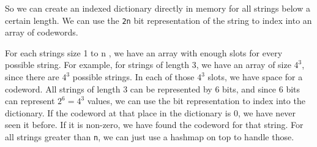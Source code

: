 \documentclass[12pt,twoside]{reedthesis}
\begin{document}
So we can create an indexed dictionary directly in memory for all strings below a certain length. We can use the \texttt{2n} bit representation of the string
to index into an array of codewords.

For each strings size 1 to n , we have an array with enough slots for every possible string. For example, for strings of length 3, we have an array of size \(4^3\), since there are \(4^3\) possible strings. In each of those \(4^3\) slots, we have space for a codeword. All strings of length 3 can be represented by 6 bits, and since 6 bits can represent \(2^6=4^3\) values, we can use the bit representation to index into the dictionary. If the codeword at that place in the dictionary is 0, we have never seen it before. If it is non-zero, we have found the codeword for that string. For all strings greater than \texttt{n}, we can just use a hashmap on top to handle those.
\end{document}
